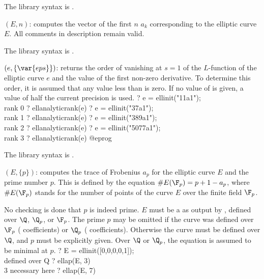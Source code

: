 The library syntax is .

$(E,n)$: \label{se:ellan}
computes the vector of the first $n$ $a_k$
corresponding to the elliptic curve $E$. All comments in 
description remain valid.

The library syntax is .

$(e, \{\var{eps}\})$: \label{se:ellanalyticrank}returns the order of vanishing at $s=1$ of the $L$-function of the
elliptic curve $e$ and the value of the first non-zero derivative. To
determine this order, it is assumed that any value less than  is
zero. If no value of  is given, a value of half the current
precision is used.
\bprog
? e = ellinit("11a1"); \\ rank 0
? ellanalyticrank(e)
? e = ellinit("37a1"); \\ rank 1
? ellanalyticrank(e)
? e = ellinit("389a1"); \\ rank 2
? ellanalyticrank(e)
? e = ellinit("5077a1"); \\ rank 3
? ellanalyticrank(e)
@eprog

The library syntax is .

$(E,\{p\})$: \label{se:ellap}computes the trace of Frobenius $a_p$ for the elliptic curve $E$ and the
prime number $p$. This is defined by the equation $\#E(\F_p) = p+1 - a_p$,
where $\#E(\F_p)$ stands for the number of points of the curve $E$ over the
finite field $\F_p$.

No checking is done that $p$ is indeed prime. $E$ must be a  as
output by , defined over $\Q$, $\Q_p$, or $\F_p$. The prime $p$
may be omitted if the curve was defined over $\F_p$ (
coefficients) or $\Q_p$ ( coefficients). Otherwise the curve must
be defined over $\Q$, and $p$ must be explicitly given. Over $\Q$ or
$\Q_p$, the equation is assumed to be minimal at $p$.
\bprog
? E = ellinit([0,0,0,0,1]);  \\ defined over Q
? ellap(E, 3)  \\ 3 necessary here
? ellap(E, 7)

